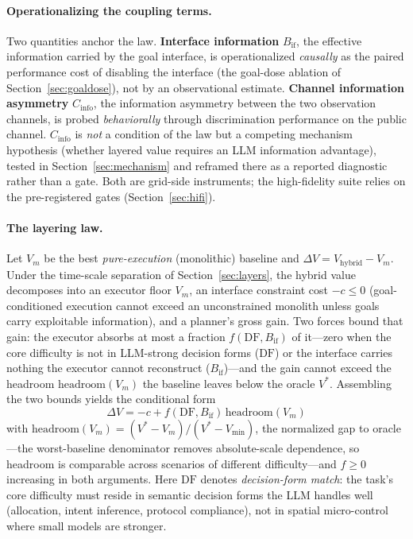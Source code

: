 \documentclass[sigconf,anonymous]{aamas}
\newcommand{\Cinfo}{C_{\mathrm{info}}}
\newcommand{\Bif}{B_{\mathrm{if}}}
\newcommand{\headroom}{\mathrm{headroom}}
\begin{document}
\paragraph{Operationalizing the coupling terms.}
Two quantities anchor the law. \textbf{Interface information} $\Bif$, the effective information carried by the goal interface, is operationalized \emph{causally} as the paired performance cost of disabling the interface (the goal-dose ablation of Section~\ref{sec:goaldose}), not by an observational estimate. \textbf{Channel information asymmetry} $\Cinfo$, the information asymmetry between the two observation channels, is probed \emph{behaviorally} through discrimination performance on the public channel. $\Cinfo$ is \emph{not} a condition of the law but a competing mechanism hypothesis (whether layered value requires an LLM information advantage), tested in Section~\ref{sec:mechanism} and reframed there as a reported diagnostic rather than a gate. Both are grid-side instruments; the high-fidelity suite relies on the pre-registered gates (Section~\ref{sec:hifi}).

\paragraph{The layering law.}
Let $V_m$ be the best \emph{pure-execution} (monolithic) baseline and $\Delta V = V_{\mathrm{hybrid}} - V_m$. Under the time-scale separation of Section~\ref{sec:layers}, the hybrid value decomposes into an executor floor $V_m$, an interface constraint cost $-c \leq 0$ (goal-conditioned execution cannot exceed an unconstrained monolith unless goals carry exploitable information), and a planner's gross gain. Two forces bound that gain: the executor absorbs at most a fraction $f(\mathrm{DF},\Bif)$ of it---zero when the core difficulty is not in LLM-strong decision forms ($\mathrm{DF}$) or the interface carries nothing the executor cannot reconstruct ($\Bif$)---and the gain cannot exceed the headroom $\headroom(V_m)$ the baseline leaves below the oracle $V^*$. Assembling the two bounds yields the conditional form
\begin{equation}
\!\Delta V = -c\!+\!f(\mathrm{DF},\Bif)\,\headroom(V_m)\!
\label{eq:law}
\end{equation}
with $\headroom(V_m) = (V^* - V_m)/(V^* - V_{\min})$, the normalized gap to oracle---the worst-baseline denominator removes absolute-scale dependence, so headroom is comparable across scenarios of different difficulty---and $f \geq 0$ increasing in both arguments. Here $\mathrm{DF}$ denotes \emph{decision-form match}: the task's core difficulty must reside in semantic decision forms the LLM handles well (allocation, intent inference, protocol compliance), not in spatial micro-control where small models are stronger.
\end{document}
